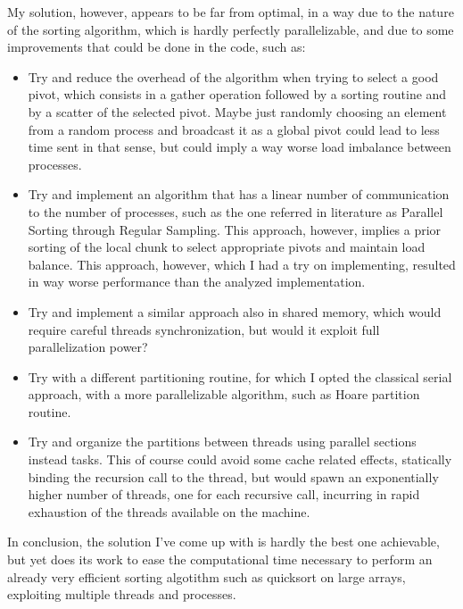 \documentclass{article}
\begin{document}
	My solution, however, appears to be far from optimal, in a way due to the nature of the sorting algorithm, which is hardly perfectly parallelizable, and due to some improvements that could be done in the code, such as:
	\begin{itemize}
		\item Try and reduce the overhead of the algorithm when trying to select a good pivot, which consists in a gather operation followed by a sorting routine and by a scatter of the selected pivot. Maybe just randomly choosing an element from a random process and broadcast it as a global pivot could lead to less time sent in that sense, but could imply a way worse load imbalance between processes.
		\item Try and implement an algorithm that has a linear number of communication to the number of processes, such as the one referred in literature as Parallel Sorting through Regular Sampling. This approach, however, implies a prior sorting of the local chunk to select appropriate pivots and maintain load balance. This approach, however, which I had a try on implementing, resulted in way worse performance than the analyzed implementation.
		\item Try and implement a similar approach also in shared memory, which would require careful threads synchronization, but would it exploit full parallelization power?
		\item Try with a different partitioning routine, for which I opted the classical serial approach, with a more parallelizable algorithm, such as Hoare partition routine.
		\item Try and organize the partitions between threads using parallel sections instead tasks. This of course could avoid some cache related effects, statically binding the recursion call to the thread, but would spawn an exponentially higher number of threads, one for each recursive call, incurring in rapid exhaustion of the threads available on the machine.
	\end{itemize}
	
	In conclusion, the solution I've come up with is hardly the best one achievable, but yet does its work to ease the computational time necessary to perform an already very efficient sorting algotithm such as quicksort on large arrays, exploiting multiple threads and processes.
	
	\newpage
	
	
	 
\end{document}
